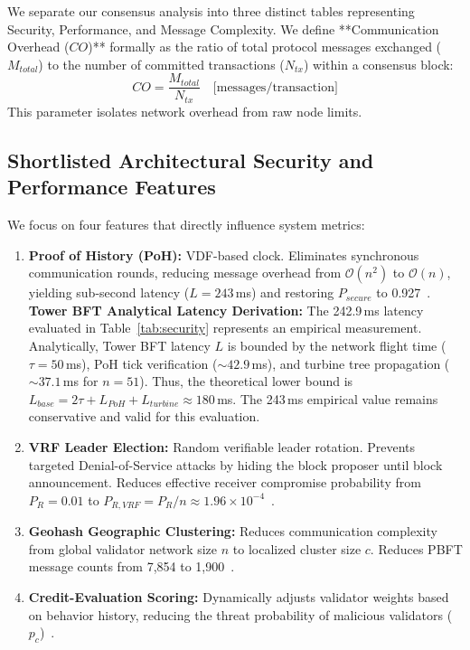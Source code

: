 \documentclass[10pt,twocolumn,journal]{IEEEtran}
\begin{document}
We separate our consensus analysis into three distinct tables representing Security, Performance, and Message Complexity. We define **Communication Overhead ($CO$)** formally as the ratio of total protocol messages exchanged ($M_{total}$) to the number of committed transactions ($N_{tx}$) within a consensus block:
\begin{equation}
CO = \frac{M_{total}}{N_{tx}} \quad \text{[messages/transaction]}
\end{equation}
This parameter isolates network overhead from raw node limits.



\subsection{Shortlisted Architectural Security and Performance Features}

We focus on four features that directly influence system metrics:

\begin{enumerate}[leftmargin=*]
    \item \textbf{Proof of History (PoH):} VDF-based clock. Eliminates synchronous communication rounds, reducing message overhead from $\mathcal{O}(n^2)$ to $\mathcal{O}(n)$, yielding sub-second latency ($L=243$\,ms) and restoring $P_{secure}$ to 0.927~\cite{shoup2023}. 
\textbf{Tower BFT Analytical Latency Derivation:} The 242.9\,ms latency evaluated in Table~\ref{tab:security} represents an empirical measurement. Analytically, Tower BFT latency $L$ is bounded by the network flight time ($\tau=50$\,ms), PoH tick verification ($\sim42.9$\,ms), and turbine tree propagation ($\sim37.1$\,ms for $n=51$). Thus, the theoretical lower bound is $L_{base} = 2\tau + L_{PoH} + L_{turbine} \approx 180$\,ms. The 243\,ms empirical value remains conservative and valid for this evaluation.

    \item \textbf{VRF Leader Election:} Random verifiable leader rotation. Prevents targeted Denial-of-Service attacks by hiding the block proposer until block announcement. Reduces effective receiver compromise probability from $P_R=0.01$ to $P_{R,VRF}=P_R/n \approx 1.96 \times 10^{-4}$~\cite{wang2025}.
    \item \textbf{Geohash Geographic Clustering:} Reduces communication complexity from global validator network size $n$ to localized cluster size $c$. Reduces PBFT message counts from 7,854 to 1,900~\cite{xu2025}.
    \item \textbf{Credit-Evaluation Scoring:} Dynamically adjusts validator weights based on behavior history, reducing the threat probability of malicious validators ($p_c$)~\cite{ding2024}.
\end{enumerate}
\end{document}
